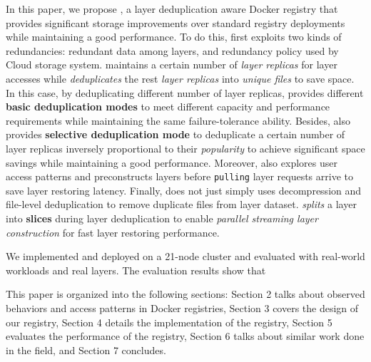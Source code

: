 In this paper, we propose \sysname, a layer deduplication aware Docker registry 
that provides significant storage improvements over standard registry deployments while maintaining a good performance. 
To do this, \sysname first exploits two kinds of redundancies: redundant data among layers, and redundancy policy used by Cloud storage system.
\sysname maintains a certain number of \emph{layer replicas} for layer accesses while
\emph{deduplicates} the rest \emph{layer replicas} into \emph{unique files} to save space.
In this case, 
by deduplicating different number of layer replicas,
\sysname provides different \textbf{basic deduplication modes} to meet different capacity and performance requirements
while maintaining the same failure-tolerance ability.
Besides,
\sysname also provides \textbf{selective deduplication mode} to 
deduplicate a certain number of layer replicas inversely proportional to their \emph{popularity} to achieve significant space savings while maintaining a good performance.
Moreover, \sysname also explores user access patterns 
and preconstructs layers before \texttt{pulling} layer requests arrive to save layer restoring latency. 
Finally, 
\sysname does not just simply uses decompression and file-level deduplication to remove duplicate files from layer dataset.
\sysname \emph{splits} a layer into \textbf{slices} during layer deduplication
to enable \emph{parallel streaming layer construction}
for fast layer restoring performance.

We implemented and deployed \sysname on a 21-node cluster and evaluated with real-world workloads and real layers.
The evaluation results show that

This paper is organized into the following sections: Section 2 talks about observed behaviors and access patterns in Docker registries, Section 3 covers the design of our registry, Section 4 details the implementation of the registry, Section 5 evaluates the performance of the registry, Section 6 talks about similar work done in the field, and Section 7 concludes. 

  

